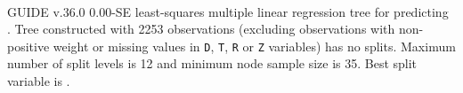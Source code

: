 \documentclass[12pt]{article}
\begin{document}
 \begin{center}
    ~{}
 \end{center}
GUIDE v.36.0 0.00-SE
least-squares multiple linear regression tree
for predicting \texttt{}.
 Tree constructed with 2253 observations
 (excluding observations with non-positive weight or missing values
 in \texttt{D}, \texttt{T}, \texttt{R} or \texttt{Z} variables) has no splits.
 Maximum number of split levels is 12 and minimum node sample size is 35.
 Best split variable is \texttt{}.
 
\end{document}
